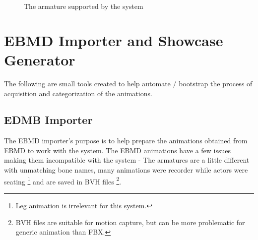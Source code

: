 \begin{figure}[!ht]
\centerline{}
\caption{The armature supported by the system}\label{fig:armature}
\end{figure}


\section{EBMD Importer and Showcase Generator}
The following are small tools created to help automate / bootstrap the process of acquisition and categorization of the animations.


\subsection{EDMB Importer}
The EBMD importer's purpose is to help prepare the animations obtained from EBMD to work with the system. The EBMD animations have a few issues making them incompatible with the system - The armatures are a little different with unmatching bone names, many animations were recorder while actors were seating \footnote{Leg animation is irrelevant for this system.} and are saved in BVH files \footnote{BVH files are suitable for motion capture, but can be more problematic for generic animation than FBX.}.

